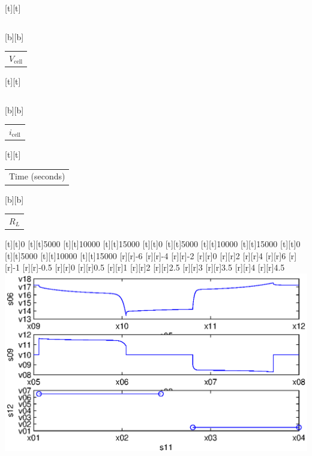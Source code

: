 %    
%
%
\begin{psfrags}%
\psfragscanon%
%
[t][t]{\color[rgb]{0,0,0}\setlength{\tabcolsep}{0pt}\begin{tabular}{c}\end{tabular}}%
[b][b]{\color[rgb]{0,0,0}\setlength{\tabcolsep}{0pt}\begin{tabular}{c}$V_\text{cell}$\end{tabular}}%
[t][t]{\color[rgb]{0,0,0}\setlength{\tabcolsep}{0pt}\begin{tabular}{c}\end{tabular}}%
[b][b]{\color[rgb]{0,0,0}\setlength{\tabcolsep}{0pt}\begin{tabular}{c}$i_\text{cell}$\end{tabular}}%
[t][t]{\color[rgb]{0,0,0}\setlength{\tabcolsep}{0pt}\begin{tabular}{c}Time (seconds)\end{tabular}}%
[b][b]{\color[rgb]{0,0,0}\setlength{\tabcolsep}{0pt}\begin{tabular}{c}$R_L$\end{tabular}}%
%
[t][t]{0}%
[t][t]{5000}%
[t][t]{10000}%
[t][t]{15000}%
[t][t]{0}%
[t][t]{5000}%
[t][t]{10000}%
[t][t]{15000}%
[t][t]{0}%
[t][t]{5000}%
[t][t]{10000}%
[t][t]{15000}%
%
[r][r]{-6}%
[r][r]{-4}%
[r][r]{-2}%
[r][r]{0}%
[r][r]{2}%
[r][r]{4}%
[r][r]{6}%
[r][r]{-1}%
[r][r]{-0.5}%
[r][r]{0}%
[r][r]{0.5}%
[r][r]{1}%
[r][r]{2}%
[r][r]{2.5}%
[r][r]{3}%
[r][r]{3.5}%
[r][r]{4}%
[r][r]{4.5}%
%
\includegraphics[width=15cm]{batt_load_exp_noisy.eps}%
\end{psfrags}%
%
